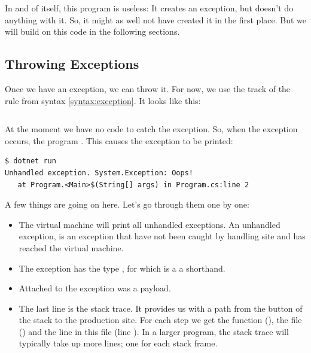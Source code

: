 \inputminted[]{csharp}{../src/csharp/exceptions/creation/Program.cs}

In and of itself, this program is useless: It creates an exception, but doesn't do anything with it. So, it might as well not have created it in the first place. But we will build on this code in the following sections.

\subsection{Throwing Exceptions}

Once we have an exception, we can throw it. For now, we use the  track of the  rule from syntax \ref{syntax:exception}. It looks like this:

\inputminted[firstline=1]{csharp}{../src/csharp/exceptions/throwing/Program.cs}

At the moment we have no code to catch the exception. So, when the exception occurs, the program . This causes the exception to be printed:

\begin{verbatim}
$ dotnet run
Unhandled exception. System.Exception: Oops!
   at Program.<Main>$(String[] args) in Program.cs:line 2
\end{verbatim}

A few things are going on here. Let's go through them one by one:
\begin{itemize}
  \item The virtual machine will print all unhandled exceptions. An unhandled exception, is an exception that have not been caught by handling site and has reached the virtual machine.
  \item The exception has the type , for which  is a a shorthand.
  \item Attached to the exception was a  payload.
  \item The last line is the stack trace. It provides us with a path from the button of the stack to the production site. For each step we get the function (), the file () and the line in this file (line ). In a larger program, the stack trace will typically take up more lines; one for each stack frame.
\end{itemize}

